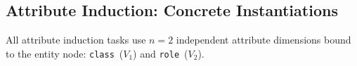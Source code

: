 \documentclass[11pt]{article}
\begin{document}


\subsection{Attribute Induction: Concrete Instantiations}

All attribute induction tasks use $n=2$ independent attribute dimensions bound to the entity node: \texttt{class}~($V_1$) and \texttt{role}~($V_2$).
\end{document}
